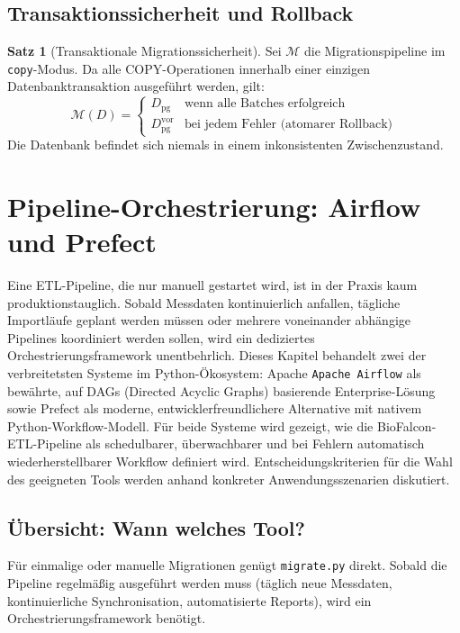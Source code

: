 \documentclass[12pt,a4paper]{report}
\theoremstyle{definition}
\newtheorem{theorem}{Satz}[section]
\theoremstyle{remark}
\newcommand{\airflow}{\texttt{Apache Airflow}}
\newcommand{\code}[1]{\texttt{#1}}
\begin{document}
\section{Transaktionssicherheit und Rollback}

\begin{theorem}[Transaktionale Migrationssicherheit]
  Sei $\mathcal{M}$ die Migrationspipeline im \code{copy}-Modus.
  Da alle COPY-Operationen innerhalb einer einzigen Datenbanktransaktion
  ausgeführt werden, gilt:
  \[
    \mathcal{M}(D) =
    \begin{cases}
      D_{\text{pg}} & \text{wenn alle Batches erfolgreich} \\
      D_{\text{pg}}^{\text{vor}} & \text{bei jedem Fehler (atomarer Rollback)}
    \end{cases}
  \]
  Die Datenbank befindet sich niemals in einem inkonsistenten
  Zwischenzustand.
\end{theorem}

\chapter{Pipeline-Orchestrierung: Airflow und Prefect}
\label{sec:orchestration}

Eine ETL-Pipeline, die nur manuell gestartet wird, ist in der Praxis kaum produktionstauglich. Sobald Messdaten kontinuierlich anfallen, tägliche Importläufe geplant werden müssen oder mehrere voneinander abhängige Pipelines koordiniert werden sollen, wird ein dediziertes Orchestrierungsframework unentbehrlich. Dieses Kapitel behandelt zwei der verbreitetsten Systeme im Python-Ökosystem: Apache \airflow{} als bewährte, auf DAGs (Directed Acyclic Graphs) basierende Enterprise-Lösung sowie Prefect als moderne, entwicklerfreundlichere Alternative mit nativem Python-Workflow-Modell. Für beide Systeme wird gezeigt, wie die BioFalcon-ETL-Pipeline als schedulbarer, überwachbarer und bei Fehlern automatisch wiederherstellbarer Workflow definiert wird. Entscheidungskriterien für die Wahl des geeigneten Tools werden anhand konkreter Anwendungsszenarien diskutiert.

\section{Übersicht: Wann welches Tool?}

Für einmalige oder manuelle Migrationen genügt \code{migrate.py}
direkt. Sobald die Pipeline regelmä\ss{}ig ausgeführt werden muss
(täglich neue Messdaten, kontinuierliche Synchronisation, automatisierte
Reports), wird ein Orchestrierungsframework ben\"otigt.
\end{document}
